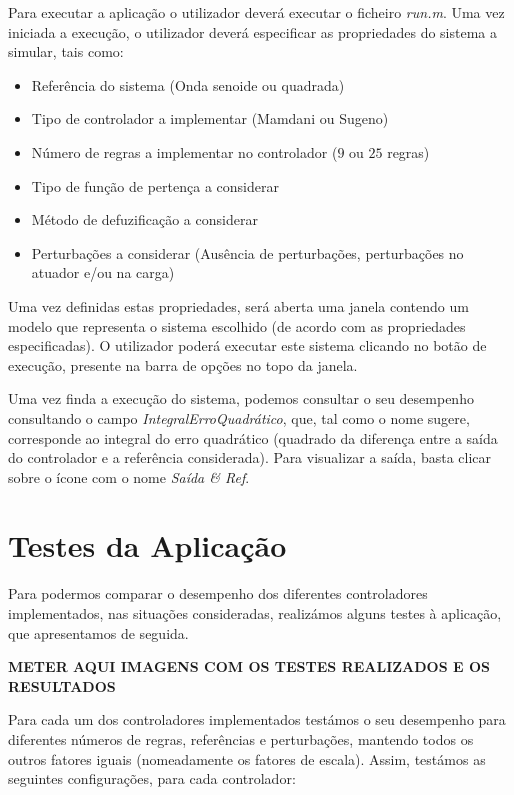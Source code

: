 \documentclass{article}
\begin{document}
Para executar a aplicação o utilizador deverá executar o ficheiro \emph{run.m}. Uma vez iniciada a execução, o utilizador deverá especificar as propriedades do sistema a simular, tais como:

\begin{itemize}
\item Referência do sistema (Onda senoide ou quadrada)
\item Tipo de controlador a implementar (Mamdani ou Sugeno)
\item Número de regras a implementar no controlador ($9$ ou $25$ regras)
\item Tipo de função de pertença a considerar
\item Método de defuzificação a considerar
\item Perturbações a considerar (Ausência de perturbações, perturbações no atuador e/ou na carga)
\end{itemize}

Uma vez definidas estas propriedades, será aberta uma janela contendo um modelo que representa o sistema escolhido (de acordo com as propriedades especificadas). O utilizador poderá executar este sistema clicando no botão de execução, presente na barra de opções no topo da janela.

Uma vez finda a execução do sistema, podemos consultar o seu desempenho consultando o campo \emph{IntegralErroQuadrático}, que, tal como o nome sugere, corresponde ao integral do erro quadrático (quadrado da diferença entre a saída do controlador e a referência considerada). Para visualizar a saída, basta clicar sobre o ícone com o nome \emph{Saída \& Ref}.

\pagebreak

\section{Testes da Aplicação}

Para podermos comparar o desempenho dos diferentes controladores implementados, nas situações consideradas, realizámos alguns testes à aplicação, que apresentamos de seguida.

\textbf{METER AQUI IMAGENS COM OS TESTES REALIZADOS E OS RESULTADOS}

Para cada um dos controladores implementados testámos o seu desempenho para diferentes números de regras, referências e perturbações, mantendo todos os outros fatores iguais (nomeadamente os fatores de escala). Assim, testámos as seguintes configurações, para cada controlador:
\end{document}
